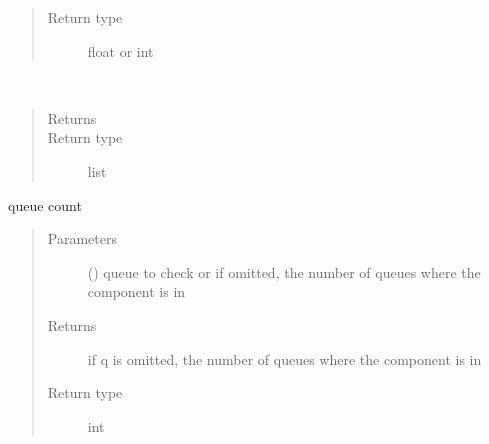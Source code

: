 \documentclass[letterpaper,10pt,english]{sphinxmanual}
\begin{document}
\begin{fulllineitems}
\begin{fulllineitems}
\begin{quote}
\begin{description}
\item[{Return type}] \leavevmode
float or int

\end{description}\end{quote}

\end{fulllineitems}


\begin{fulllineitems}
\label{\detokenize{Reference:salabim.Component.claimed_resources}}~\begin{quote}\begin{description}
\item[{Returns}] \leavevmode
{}

\item[{Return type}] \leavevmode
list

\end{description}\end{quote}

\end{fulllineitems}


\begin{fulllineitems}
\label{\detokenize{Reference:salabim.Component.count}}
queue count
\begin{quote}\begin{description}
\item[{Parameters}] \leavevmode
{} ({\hyperref[\detokenize{Reference:salabim.Queue}]{}}) \textendash{} queue to check or 
if omitted, the number of queues where the component is in

\item[{Returns}] \leavevmode
{} \textendash{} 
if q is omitted, the number of queues where the component is in

\item[{Return type}] \leavevmode
int

\end{description}\end{quote}


\end{fulllineitems}
\end{fulllineitems}
\end{document}
